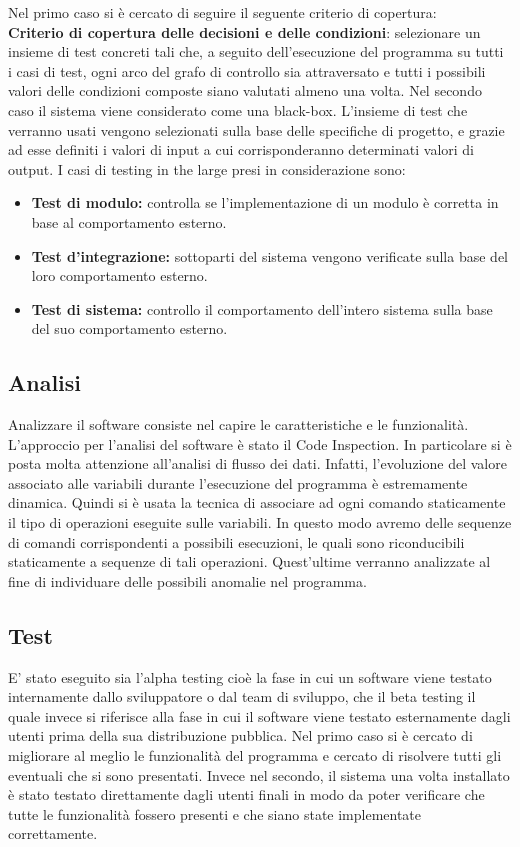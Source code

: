 \documentclass[a4paper,final,12pt]{report}
\begin{document}
Nel primo caso si è cercato di seguire il seguente criterio di copertura:\\
\textbf{Criterio di copertura delle decisioni e delle condizioni}: selezionare un insieme di test concreti tali che, a seguito dell'esecuzione del programma su tutti i casi di test, ogni arco del grafo di controllo sia attraversato e tutti i possibili valori delle condizioni composte siano valutati almeno una volta.
Nel secondo caso il sistema viene considerato come una black-box. L'insieme di test che verranno usati vengono selezionati sulla base delle specifiche di progetto, e grazie ad esse definiti i valori di input a cui corrisponderanno determinati valori di output. 
I casi di testing in the large presi in considerazione sono:
\begin{itemize}
\item \textbf{Test di modulo:} controlla se l'implementazione di un modulo è corretta in base al comportamento esterno.
\item \textbf{Test d'integrazione:} sottoparti del sistema vengono verificate sulla base del loro comportamento esterno.
\item \textbf{Test di sistema:} controllo il comportamento dell'intero sistema sulla  base del suo comportamento esterno. 
\end{itemize}

\subsection{Analisi}
Analizzare il software consiste nel capire le caratteristiche e le funzionalità.
L'approccio per l'analisi del software è stato il Code Inspection. In particolare si è posta molta attenzione all'analisi di flusso dei dati.
Infatti, l'evoluzione del valore associato alle variabili durante l'esecuzione del programma è estremamente dinamica. Quindi si è usata la tecnica di associare ad ogni comando staticamente il tipo di operazioni eseguite sulle variabili. In questo modo avremo delle sequenze di comandi corrispondenti a possibili esecuzioni, le quali sono riconducibili staticamente a sequenze di tali operazioni. Quest'ultime verranno analizzate al fine di individuare delle possibili anomalie nel programma.

\subsection{Test}
E' stato eseguito sia l'alpha testing cioè la fase in cui un software viene testato internamente dallo sviluppatore o dal team di sviluppo, che il beta testing il quale invece si riferisce alla fase in cui il software viene testato esternamente dagli utenti prima della sua distribuzione pubblica. Nel primo caso si è cercato di migliorare al meglio le funzionalità del programma e cercato di risolvere tutti gli eventuali che si sono presentati. Invece nel secondo, il sistema una volta installato è stato testato direttamente dagli utenti finali in modo da poter verificare che tutte le funzionalità fossero presenti e che siano state implementate correttamente.
\end{document}
